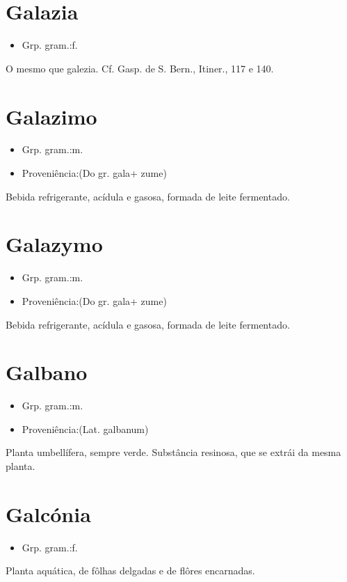 \section{Galazia}
\begin{itemize}
\item {Grp. gram.:f.}
\end{itemize}
O mesmo que \textunderscore galezia\textunderscore . Cf. Gasp. de S. Bern., \textunderscore Itiner.\textunderscore , 117 e 140.
\section{Galazimo}
\begin{itemize}
\item {Grp. gram.:m.}
\end{itemize}
\begin{itemize}
\item {Proveniência:(Do gr. \textunderscore gala\textunderscore  + \textunderscore zume\textunderscore )}
\end{itemize}
Bebida refrigerante, acídula e gasosa, formada de leite fermentado.
\section{Galazymo}
\begin{itemize}
\item {Grp. gram.:m.}
\end{itemize}
\begin{itemize}
\item {Proveniência:(Do gr. \textunderscore gala\textunderscore  + \textunderscore zume\textunderscore )}
\end{itemize}
Bebida refrigerante, acídula e gasosa, formada de leite fermentado.
\section{Galbano}
\begin{itemize}
\item {Grp. gram.:m.}
\end{itemize}
\begin{itemize}
\item {Proveniência:(Lat. \textunderscore galbanum\textunderscore )}
\end{itemize}
Planta umbellífera, sempre verde.
Substância resinosa, que se extrái da mesma planta.
\section{Galcónia}
\begin{itemize}
\item {Grp. gram.:f.}
\end{itemize}
Planta aquática, de fôlhas delgadas e de flôres encarnadas.
